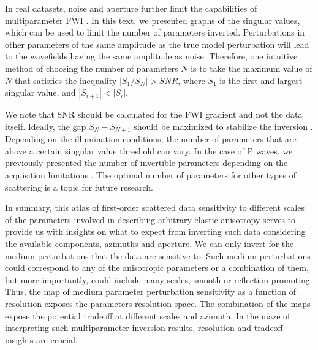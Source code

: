 In real datasets, noise and aperture further limit the capabilities of multiparameter FWI \citep{masmoudi2018, oh2018}. In this text, we presented graphs of the singular values, which can be used to limit the number of parameters inverted.
Perturbations in other parameters of the same amplitude as the true model perturbation will lead to the wavefields having the same amplitude as noise. Therefore, one intuitive method of choosing the number of parameters $N$ is to take the maximum value of $N$ that satisfies the inequality $|S_{1}/S_{N}| > SNR$, where $S_{1}$ is the first and largest singular value, and $|S_{i+1}|<|S_{i}|$.

We note that SNR should be calculated for the FWI gradient and not the data itself. Ideally, the gap $S_{N}-S_{N+1}$ should be maximized to stabilize the inversion \citep{cheverda1995, kazei2018}.  
Depending on the illumination conditions, the number of parameters that are above a certain singular value threshold can vary. In the case of P waves, we previously presented the number of invertible parameters depending on the acquisition limitations \citep{kazei2018}. The optimal number of parameters for other types of scattering is a topic for future research.

In summary, this atlas of first-order scattered data sensitivity to different scales of the parameters involved in describing arbitrary elastic anisotropy serves to provide us with insights on what to expect from inverting such data considering the available components, azimuths and aperture. We can only invert for the medium perturbations that the data are sensitive to. Such medium perturbations could correspond to any of the anisotropic parameters or a combination of them, but more importantly, could include many scales, smooth or reflection promoting. Thus, the map of medium parameter perturbation sensitivity as a function of resolution exposes the parameters resolution space. The combination of the maps expose the potential tradeoff at different scales and azimuth. In the maze of interpreting such multiparameter inversion results, resolution and tradeoff insights are crucial.
